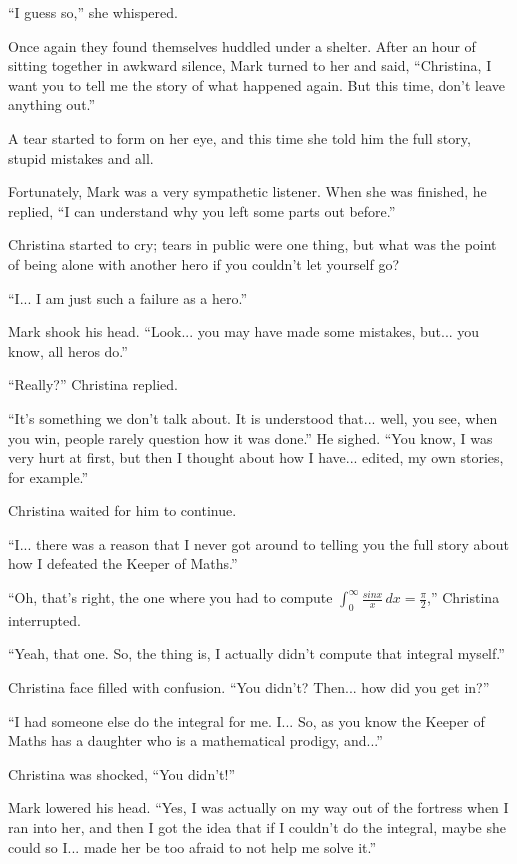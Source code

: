 \documentclass[showtrims,b6paper,draft,10pt]{memoir}
\begin{document}
``I guess so,'' she whispered.

Once again they found themselves huddled under a shelter.  After an hour of sitting together in awkward silence, Mark turned to her and said,  ``Christina, I want you to tell me the story of what happened again.  But this time, don't leave anything out.''

A tear started to form on her eye, and this time she told him the full story, stupid mistakes and all.

Fortunately, Mark was a very sympathetic listener.  When she was finished, he replied, ``I can understand why you left some parts out before.''

Christina started to cry;  tears in public were one thing, but what was the point of being alone with another hero if you couldn't let yourself go?

``I... I am just such a failure as a hero.''

Mark shook his head.  ``Look... you may have made some mistakes, but... you know, all heros do.''

``Really?'' Christina replied.

``It's something we don't talk about.  It is understood that...  well, you see, when you win, people rarely question how it was done.''  He sighed.  ``You know, I was very hurt at first, but then I thought about how I have... edited, my own stories, for example.''

Christina waited for him to continue.

``I... there was a reason that I never got around to telling you the full story about how I defeated the Keeper of Maths.''

``Oh, that's right, the one where you had to compute $\int_0^{\infty}\!\frac{sin x}{x}\,dx=\frac{\pi}{2}$,'' Christina interrupted.

``Yeah, that one.  So, the thing is, I actually didn't compute that integral myself.''

Christina face filled with confusion.  ``You didn't?  Then... how did you get in?''

``I had someone else do the integral for me.  I... So, as you know the Keeper of Maths has a daughter who is a mathematical prodigy, and...''

Christina was shocked, ``You didn't!''

Mark lowered his head.  ``Yes, I was actually on my way out of the fortress when I ran into her, and then I got the idea that if I couldn't do the integral, maybe she could so I... made her be too afraid to not help me solve it.''
\end{document}
